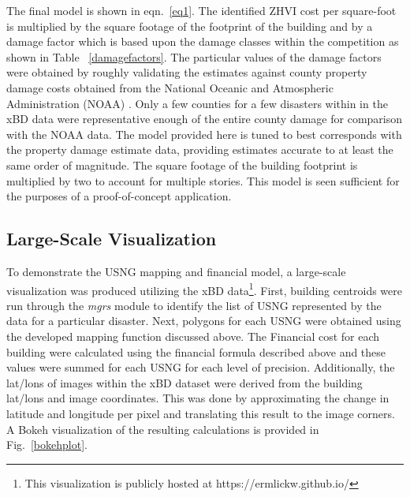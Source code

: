 \documentclass[conference]{IEEEtran}
\begin{document}
The final model is shown in eqn.~\ref{eq1}. The identified ZHVI cost per square-foot is multiplied  by the square footage of the footprint of the building and by a damage factor which is based upon the damage classes within the competition as shown in Table ~\ref{damagefactors}. The particular values of the damage factors were obtained by roughly validating the estimates against county property damage costs obtained from the National Oceanic and Atmospheric Administration (NOAA) \cite{a16}. Only a few counties for a few disasters within in the xBD data were representative enough of the entire county damage for comparison with the NOAA data. The model provided here is tuned to best corresponds with the property damage estimate data, providing estimates accurate to at least the same order of magnitude. The square footage of the building footprint is multiplied by two to account for multiple stories. This model is seen sufficient for the purposes of a proof-of-concept application. 

\subsection{Large-Scale Visualization}


To demonstrate the USNG mapping and financial model, a large-scale visualization was produced utilizing the xBD data\footnote{ This visualization is publicly hosted at https://ermlickw.github.io/}. First, building centroids were run through the \emph{mgrs} module to identify the list of USNG represented by the data for a particular disaster. Next, polygons for each USNG were obtained using the developed mapping function discussed above. The Financial cost for each building were calculated using the financial formula described above and these values were summed for each USNG for each level of precision. Additionally, the lat/lons of images within the xBD dataset were derived from the building lat/lons and image coordinates. This was done by approximating the change in latitude and longitude per pixel and translating this result to the image corners.  A Bokeh visualization of the resulting calculations is provided in Fig.~\ref{bokehplot}. 
\end{document}
